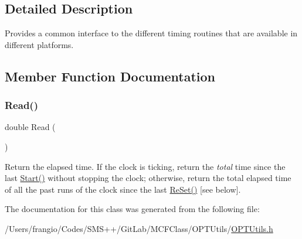 \subsection{Detailed Description}
Provides a common interface to the different timing routines that are available in different platforms. 

\subsection{Member Function Documentation}
\mbox{\label{class_o_p_ttypes__di__unipi__it_1_1_o_p_ttimers_af0ce31a284ab2dedf9cede10bc3ccce0}} 
\subsubsection{\texorpdfstring{Read()}{Read()}}
{\footnotesize\ttfamily double Read (\begin{DoxyParamCaption}\item[{void}]{ }\end{DoxyParamCaption})\hspace{0.3cm}{\ttfamily [inline]}}

Return the elapsed time. If the clock is ticking, return the {\itshape total} time since the last \mbox{\hyperlink{class_o_p_ttypes__di__unipi__it_1_1_o_p_ttimers_a983601e8aa8b271fc7a583c1c4eb34a6}{Start()}} without stopping the clock; otherwise, return the total elapsed time of all the past runs of the clock since the last \mbox{\hyperlink{class_o_p_ttypes__di__unipi__it_1_1_o_p_ttimers_a83cd017adcfdb6d5b0a66aea8f6508b6}{Re\+Set()}} \mbox{[}see below\mbox{]}. 

The documentation for this class was generated from the following file\+:\begin{DoxyCompactItemize}
\item 
/\+Users/frangio/\+Codes/\+S\+M\+S++/\+Git\+Lab/\+M\+C\+F\+Class/\+O\+P\+T\+Utils/\mbox{\hyperlink{_o_p_t_utils_8h}{O\+P\+T\+Utils.\+h}}\end{DoxyCompactItemize}
